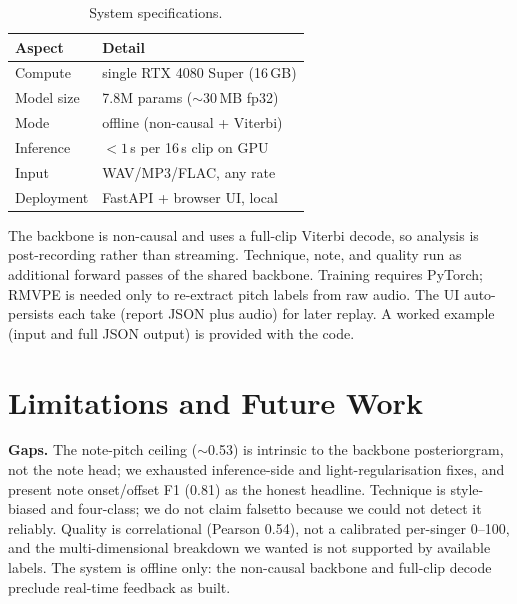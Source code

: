 \documentclass{article}
\begin{document}
\begin{table}[htbp]
\centering
\begin{tabularx}{\columnwidth}{l X}
\toprule
\bfseries Aspect & \bfseries Detail \\
\midrule
Compute      & single RTX 4080 Super (16\,GB) \\
Model size   & 7.8M params ($\sim$30\,MB fp32) \\
Mode         & offline (non-causal + Viterbi) \\
Inference    & $<1$\,s per 16\,s clip on GPU \\
Input        & WAV/MP3/FLAC, any rate \\
Deployment   & FastAPI + browser UI, local \\
\bottomrule
\end{tabularx}
\caption{System specifications.}
\label{tab:specs}
\end{table}

The backbone is non-causal and uses a full-clip Viterbi decode, so analysis is
post-recording rather than streaming. Technique, note, and quality run as additional
forward passes of the shared backbone. Training requires PyTorch; RMVPE is needed only
to re-extract pitch labels from raw audio. The UI auto-persists each take (report JSON
plus audio) for later replay. A worked example (input and full JSON output) is
provided with the code.

\section{Limitations and Future Work}\label{sec:future}

\textbf{Gaps.} The note-pitch ceiling ($\sim$0.53) is intrinsic to
the backbone posteriorgram, not the note head; we exhausted inference-side and
light-regularisation fixes, and present note onset/offset F1 (0.81) as the honest
headline. Technique is style-biased and four-class; we do not claim falsetto because
we could not detect it reliably. Quality is correlational (Pearson 0.54), not a
calibrated per-singer 0--100, and the multi-dimensional breakdown we wanted is not
supported by available labels. The system is offline only: the non-causal backbone and
full-clip decode preclude real-time feedback as built.
\end{document}
